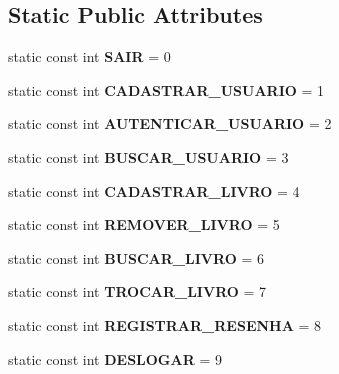 \subsection*{Static Public Attributes}
\begin{DoxyCompactItemize}
\item 
\mbox{\label{classCTRLInterfaceUsuario_a7dc6985a75cb7ad012790c0a4754637b}} 
static const int {\bfseries S\+A\+IR} = 0
\item 
\mbox{\label{classCTRLInterfaceUsuario_a13b5b61d48ee10145f57b86949e1130d}} 
static const int {\bfseries C\+A\+D\+A\+S\+T\+R\+A\+R\+\_\+\+U\+S\+U\+A\+R\+IO} = 1
\item 
\mbox{\label{classCTRLInterfaceUsuario_a12f74fced47c821077c357a1c8733b26}} 
static const int {\bfseries A\+U\+T\+E\+N\+T\+I\+C\+A\+R\+\_\+\+U\+S\+U\+A\+R\+IO} = 2
\item 
\mbox{\label{classCTRLInterfaceUsuario_a1a33ff1005caa3cbdd7ac00ff104353d}} 
static const int {\bfseries B\+U\+S\+C\+A\+R\+\_\+\+U\+S\+U\+A\+R\+IO} = 3
\item 
\mbox{\label{classCTRLInterfaceUsuario_add14fcdc928dc3455de3f0b70bb84aa1}} 
static const int {\bfseries C\+A\+D\+A\+S\+T\+R\+A\+R\+\_\+\+L\+I\+V\+RO} = 4
\item 
\mbox{\label{classCTRLInterfaceUsuario_ab3ea6c3fd005c90dc17e1f250b82eb94}} 
static const int {\bfseries R\+E\+M\+O\+V\+E\+R\+\_\+\+L\+I\+V\+RO} = 5
\item 
\mbox{\label{classCTRLInterfaceUsuario_ad3f9932d091ca9d891fb206f6310e420}} 
static const int {\bfseries B\+U\+S\+C\+A\+R\+\_\+\+L\+I\+V\+RO} = 6
\item 
\mbox{\label{classCTRLInterfaceUsuario_a5be0c02190efdb62de14738315ec0842}} 
static const int {\bfseries T\+R\+O\+C\+A\+R\+\_\+\+L\+I\+V\+RO} = 7
\item 
\mbox{\label{classCTRLInterfaceUsuario_a7e6a7f9bffc5140b6d228c8381be9f16}} 
static const int {\bfseries R\+E\+G\+I\+S\+T\+R\+A\+R\+\_\+\+R\+E\+S\+E\+N\+HA} = 8
\item 
\mbox{\label{classCTRLInterfaceUsuario_aafa55abd711b7f49b451935c63ebb8a6}} 
static const int {\bfseries D\+E\+S\+L\+O\+G\+AR} = 9
\end{DoxyCompactItemize}


